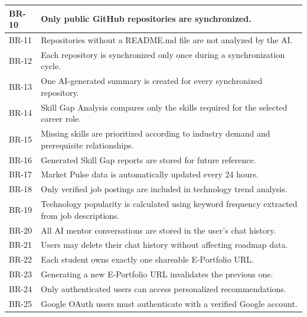 \begin{longtable}{|>{\centering\arraybackslash}p{1.6cm}|p{12cm}|}
BR-10 &
Only public GitHub repositories are synchronized.
\\ \hline

BR-11 &
Repositories without a README.md file are not analyzed by the AI.
\\ \hline

BR-12 &
Each repository is synchronized only once during a synchronization cycle.
\\ \hline

BR-13 &
One AI-generated summary is created for every synchronized repository.
\\ \hline

BR-14 &
Skill Gap Analysis compares only the skills required for the selected career role.
\\ \hline

BR-15 &
Missing skills are prioritized according to industry demand and prerequisite relationships.
\\ \hline

BR-16 &
Generated Skill Gap reports are stored for future reference.
\\ \hline

BR-17 &
Market Pulse data is automatically updated every 24 hours.
\\ \hline

BR-18 &
Only verified job postings are included in technology trend analysis.
\\ \hline

BR-19 &
Technology popularity is calculated using keyword frequency extracted from job descriptions.
\\ \hline

BR-20 &
All AI mentor conversations are stored in the user's chat history.
\\ \hline

BR-21 &
Users may delete their chat history without affecting roadmap data.
\\ \hline

BR-22 &
Each student owns exactly one shareable E-Portfolio URL.
\\ \hline

BR-23 &
Generating a new E-Portfolio URL invalidates the previous one.
\\ \hline

BR-24 &
Only authenticated users can access personalized recommendations.
\\ \hline

BR-25 &
Google OAuth users must authenticate with a verified Google account.
\\ \hline

\end{longtable}

